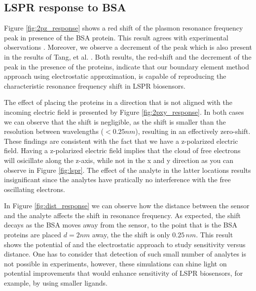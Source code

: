 \subsection{LSPR response to BSA}

Figure \ref{fig:2pz_response} shows a red shift of the plasmon resonance frequency peak in presence of the BSA protein.
This result agrees with experimental observations
\cite{TangETal2010, RaphaelETal2013}. Moreover, we observe a decrement of 
the peak which is also present in the results of Tang, et al. \cite{TangETal2010}.
Both results, the red-shift and the decrement of the peak in the presence of 
the proteins, indicate that our boundary element method approach using electrostatic
approximation, is capable of reproducing the characteristic resonance frequency 
shift in LSPR biosensors.

The effect of placing the proteins in a direction that is not aligned with the incoming electric field
is presented by Figure \ref{fig:2pxy_response}. In both cases we can observe that the shift is negligible, 
as the shift is smaller than the resolution between wavelengths ($< 0.25 nm$), resulting in an
effectively zero-shift. These findings are consistent with 
the fact that we have a z-polarized electric field. Having a z-polarized electric
field implies that the cloud of free electrons will osicillate along the z-axis, while 
not in the x and y direction as you can observe in Figure \ref{fig:lspr}. The
effect of the analyte in the latter locations results insignificant since the 
analytes have pratically no interference with the free oscillating electrons. 

In Figure \ref{fig:dist_response} we can observe how the distance between the sensor 
and the analyte affects the shift in resonance frequency. As expected, the shift decays 
as the BSA moves away from the sensor, to the point that is the BSA proteins are placed
$d=2 nm$ away, the the shift is only $0.25 \, nm$. This result shows the potential of \pygbe 
and the electrostatic approach to study sensitivity versus distance.
One has to consider that detection of such
small number of analytes is not possible in experiments, however, these simulations can shine light on
potential improvements that would enhance sensitivity of LSPR biosensors, for example, by using
smaller ligands. 




